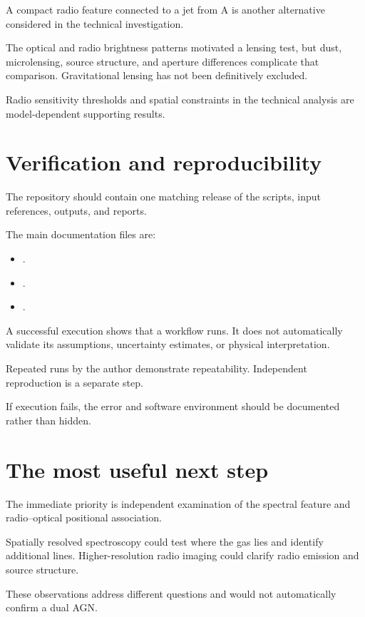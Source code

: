 \documentclass[11pt,a4paper]{article}
\begin{document}
A compact radio feature connected to a jet from A is another
alternative considered in the technical investigation.

The optical and radio brightness patterns motivated a lensing
test, but dust, microlensing, source structure, and aperture
differences complicate that comparison. Gravitational lensing
has not been definitively excluded.

Radio sensitivity thresholds and spatial constraints in the
technical analysis are model-dependent supporting results.

\section{Verification and reproducibility}

The repository should contain one matching release of the
scripts, input references, outputs, and reports.

The main documentation files are:
\begin{itemize}
    \item {}.
    \item {}.
    \item {}.
\end{itemize}

A successful execution shows that a workflow runs.
It does not automatically validate its assumptions,
uncertainty estimates, or physical interpretation.

Repeated runs by the author demonstrate repeatability.
Independent reproduction is a separate step.

If execution fails, the error and software environment
should be documented rather than hidden.

\section{The most useful next step}

The immediate priority is independent examination of the
spectral feature and radio--optical positional association.

Spatially resolved spectroscopy could test where the gas lies
and identify additional lines. Higher-resolution radio imaging
could clarify radio emission and source structure.

These observations address different questions and would not
automatically confirm a dual AGN.
\end{document}
